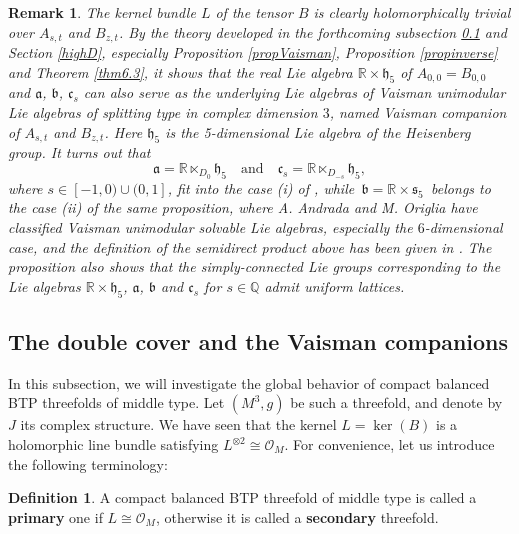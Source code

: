 \documentclass{amsart}
\numberwithin{equation}{section}
\newtheorem{remark}  [theorem]     {Remark}
\theoremstyle{definition}
\newtheorem{definition}  [theorem]     {Definition}
\renewcommand{\1}{\mathds{1}}
\renewcommand{\>}{\rightarrow}
\begin{document}
\begin{remark}
The kernel bundle $L$ of the tensor $B$ is clearly holomorphically trivial over $A_{s,t}$ and $B_{z,t}$. By
the theory developed in the forthcoming subsection \ref{double} and Section \ref{highD},
especially Proposition \ref{propVaisman}, Proposition \ref{propinverse} and Theorem \ref{thm6.3},
it shows that the real Lie algebra $\mathbb{R} \times \mathfrak{h}_5$ of $A_{0,0}=B_{0,0}$ and
 $\mathfrak{a}$, $\mathfrak{b}$,  $\mathfrak{c}_s$ can also serve as the underlying Lie algebras
of Vaisman unimodular Lie algebras of splitting type in complex dimension $3$, named Vaisman companion of $A_{s,t}$ and $B_{z,t}$.
Here $\mathfrak{h}_5$ is the 5-dimensional Lie algebra of the Heisenberg group. It turns out that
\[\mathfrak{a}=\mathbb{R} \ltimes_{D_0} \mathfrak{h}_5\quad \text{and}
\quad \mathfrak{c}_s = \mathbb{R} \ltimes_{D_{-s}} \mathfrak{h}_5,\]
where $s \in [-1,0)\cup (0,1]$, fit into the case (i) of \cite[Proposition 6.6]{AO}, while $\,\mathfrak{b}=\mathbb{R} \times \mathfrak{s}_5\,$
belongs to the case (ii) of the same proposition, where A. Andrada and M. Origlia \cite{AO}
have classified Vaisman unimodular solvable Lie algebras, especially the $6$-dimensional case,
and the definition of the semidirect product above has been given in \cite[the proof of Lemma 2.4]{AO}.
The proposition also shows that the simply-connected Lie groups corresponding to the Lie algebras
$\mathbb{R} \times \mathfrak{h}_5$, $\mathfrak{a}$, $\mathfrak{b}$ and $\mathfrak{c}_s$ for $s \in \mathbb{Q}$
admit uniform lattices.
\end{remark}

\vspace{0.1cm}

\subsection{The double cover and the Vaisman companions }\label{double}
In this subsection, we will investigate the global behavior of compact balanced BTP threefolds of middle type. Let $(M^3,g)$ be such a threefold, and denote by $J$ its complex structure. We have seen that the kernel $L=\ker (B)$ is a holomorphic line bundle satisfying $L^{\otimes 2}\cong {\mathcal O}_{\!M}$. For convenience, let us introduce the following terminology:

\begin{definition}
A compact balanced BTP threefold  of middle type is called a  {\bf primary} one if $L\cong {\mathcal O}_{\!M}$, otherwise it is called a {\bf secondary} threefold.
\end{definition}
\end{document}
